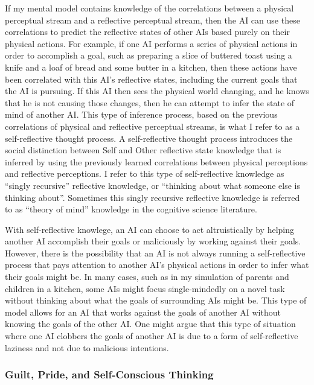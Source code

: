 If my mental model contains knowledge of the correlations between a
physical perceptual stream and a reflective perceptual stream, then
the AI can use these correlations to predict the reflective states
of other AIs based purely on their physical actions. For example,
if one AI performs a series of physical actions in order to
accomplish a goal, such as preparing a slice of buttered toast using a
knife and a loaf of bread and some butter in a kitchen, then these
actions have been correlated with this AI's reflective states,
including the current goals that the AI is pursuing. If this AI
then sees the physical world changing, and he knows that he is not
causing those changes, then he can attempt to infer the state of mind
of another AI. This type of inference process, based on the
previous correlations of physical and reflective perceptual streams,
is what I refer to as a self-reflective thought process. A
self-reflective thought process introduces the social distinction
between Self and Other reflective state knowledge that is inferred by
using the previously learned correlations between physical perceptions
and reflective perceptions. I refer to this type of self-reflective
knowledge as ``singly recursive'' reflective knowledge, or ``thinking
about what someone else is thinking about''. Sometimes this singly
recursive reflective knowledge is referred to as ``theory of mind''
knowledge in the cognitive science literature.

With self-reflective knowlege, an AI can choose to act
altruistically by helping another AI accomplish their goals or
maliciously by working against their goals. However, there is the
possibility that an AI is not always running a self-reflective
process that pays attention to another AI's physical actions in
order to infer what their goals might be. In many cases, such as in
my simulation of parents and children in a kitchen, some AIs might
focus single-mindedly on a novel task without thinking about what the
goals of surrounding AIs might be. This type of model allows for an
AI that works against the goals of another AI without knowing
the goals of the other AI. One might argue that this type of
situation where one AI clobbers the goals of another AI is due
to a form of self-reflective laziness and not due to malicious
intentions.

\subsubsection{Guilt, Pride, and Self-Conscious Thinking}

